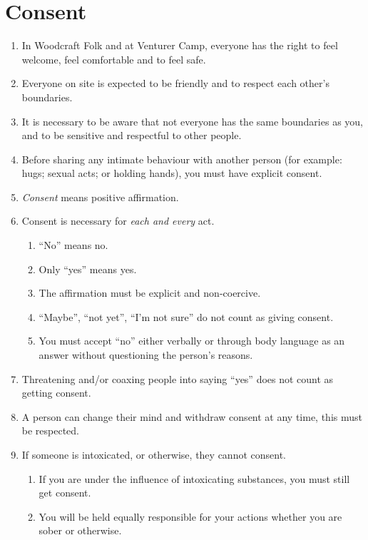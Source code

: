 \documentclass[a4paper, 11pt]{report}
\def\enumMarginIndentOne{4em}
\begin{document}
    \chapter{Consent}
    \begin{enumerate}
        \item In Woodcraft Folk and at Venturer Camp, everyone has the right to feel welcome, feel comfortable and to feel safe.
        \item Everyone on site is expected to be friendly and to respect each other's boundaries.
        \item It is necessary to be aware that not everyone has the same boundaries as you, and to be sensitive and respectful to other people.
        \item Before sharing any intimate behaviour with another person (for example: hugs; sexual acts; or holding hands), you must have explicit consent.
        \item \textit{Consent} means positive affirmation.
        \item Consent is necessary for \textit{each and every} act. 
        \begin{enumerate}[leftmargin=\enumMarginIndentOne]
            \item ``No'' means no.
            \item Only ``yes'' means yes.
            \item The affirmation must be explicit and non-coercive.
            \item ``Maybe'', ``not yet'', ``I'm not sure'' do not count as giving consent.
            \item You must accept ``no'' either verbally or through body language as an answer without questioning the person's reasons.
        \end{enumerate}
        \item Threatening and/or coaxing people into saying ``yes'' does not count as getting consent.
        \item A person can change their mind and withdraw consent at any time, this must be respected.
        \item If someone is intoxicated, or otherwise, they cannot consent.
        \begin{enumerate}[leftmargin=\enumMarginIndentOne]
            \item If you are under the influence of intoxicating substances, you must still get consent.
            \item You will be held equally responsible for your actions whether you are sober or otherwise.

\end{enumerate}
\end{enumerate}
\end{document}
